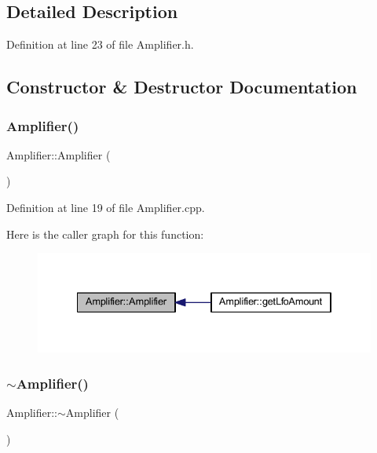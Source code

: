 \subsection{Detailed Description}


Definition at line 23 of file Amplifier.\+h.



\subsection{Constructor \& Destructor Documentation}
\mbox{\label{class_amplifier_ad89ce9e2bd6877057d15266d0d3feb4e}} 
\subsubsection{\texorpdfstring{Amplifier()}{Amplifier()}}
{\footnotesize\ttfamily Amplifier\+::\+Amplifier (\begin{DoxyParamCaption}{ }\end{DoxyParamCaption})}



Definition at line 19 of file Amplifier.\+cpp.

Here is the caller graph for this function\+:
\nopagebreak
\begin{figure}[H]
\begin{center}
\leavevmode
\includegraphics[width=334pt]{de/d01/class_amplifier_ad89ce9e2bd6877057d15266d0d3feb4e_icgraph}
\end{center}
\end{figure}
\mbox{\label{class_amplifier_a6cb2421d049843d6b1994364ea29aabd}} 
\subsubsection{\texorpdfstring{$\sim$\+Amplifier()}{~Amplifier()}}
{\footnotesize\ttfamily Amplifier\+::$\sim$\+Amplifier (\begin{DoxyParamCaption}{ }\end{DoxyParamCaption})}




